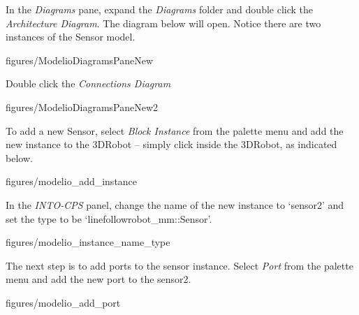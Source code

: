 \documentclass[11pt,a4paper]{../tutorial}
\begin{document}
\begin{instructions}
\newpage
\item In the \emph{Diagrams} pane, expand the \emph{Diagrams} folder and double click the \emph{Architecture Diagram}. The diagram below will open. Notice there are two instances of the Sensor model.

\begin{annotation}[width=\linewidth,trim=0 0 0 0,clip]{figures/ModelioDiagramsPaneNew}
    \end{annotation}

\item Double click the \emph{Connections Diagram}

    \begin{annotation}[width=\linewidth,trim=0 0 0 350,clip]{figures/ModelioDiagramsPaneNew2}
    \end{annotation}

\newpage
\item To add a new Sensor, select \emph{Block Instance} from the palette menu and add the new instance to the 3DRobot -- simply click inside the 3DRobot, as indicated below.

\begin{annotation}[width=0.7\linewidth,trim=0 500 0 0,clip]{figures/modelio_add_instance}
    \end{annotation}

\item In the \emph{INTO-CPS} panel, change the name of the new instance to `sensor2' and set the type to be `linefollowrobot\_mm::Sensor'.

\begin{annotation}[width=0.55\linewidth,trim=180 0 0 750,clip]{figures/modelio_instance_name_type}
\end{annotation}

\item The next step is to add ports to the sensor instance. Select \emph{Port} from the palette menu and add the new port to the sensor2.

\begin{annotation}[width=0.7\linewidth,trim=0 500 0 0,clip]{figures/modelio_add_port}
    \end{annotation}
\newpage



\end{instructions}
\end{document}
